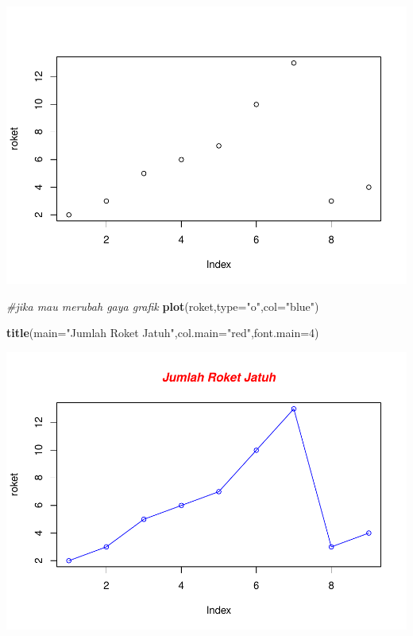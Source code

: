 \documentclass[
]{book}
\newenvironment{Shaded}{\begin{snugshade}}{\end{snugshade}}
\newcommand{\AttributeTok}[1]{\textcolor[rgb]{0.13,0.29,0.53}{#1}}
\newcommand{\CommentTok}[1]{\textcolor[rgb]{0.56,0.35,0.01}{\textit{#1}}}
\newcommand{\DecValTok}[1]{\textcolor[rgb]{0.00,0.00,0.81}{#1}}
\newcommand{\FunctionTok}[1]{\textcolor[rgb]{0.13,0.29,0.53}{\textbf{#1}}}
\newcommand{\NormalTok}[1]{#1}
\newcommand{\StringTok}[1]{\textcolor[rgb]{0.31,0.60,0.02}{#1}}
\theoremstyle{definition}
\theoremstyle{definition}
\theoremstyle{definition}
\theoremstyle{definition}
\theoremstyle{remark}
\begin{document}
\includegraphics{_main_files/figure-latex/unnamed-chunk-10-1.pdf}

\begin{Shaded}
\begin{Highlighting}[]
\CommentTok{\#jika mau merubah gaya grafik}
\FunctionTok{plot}\NormalTok{(roket,}\AttributeTok{type=}\StringTok{"o"}\NormalTok{,}\AttributeTok{col=}\StringTok{"blue"}\NormalTok{)}

\FunctionTok{title}\NormalTok{(}\AttributeTok{main=}\StringTok{"Jumlah Roket Jatuh"}\NormalTok{,}\AttributeTok{col.main=}\StringTok{"red"}\NormalTok{,}\AttributeTok{font.main=}\DecValTok{4}\NormalTok{)}
\end{Highlighting}
\end{Shaded}

\includegraphics{_main_files/figure-latex/unnamed-chunk-10-2.pdf}
\end{document}
